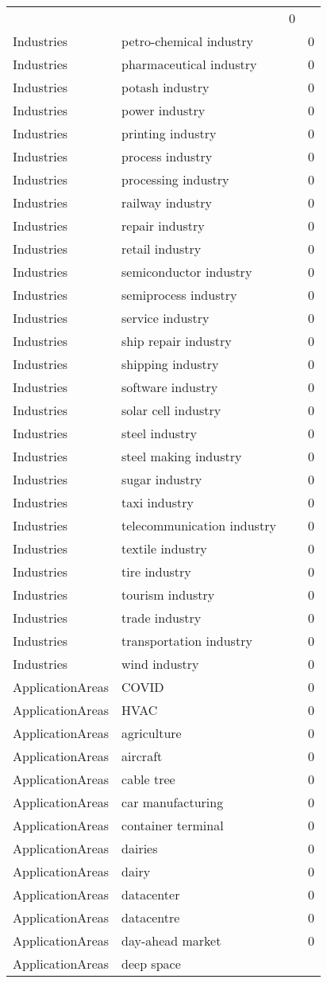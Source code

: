{\begin{longtable}{lp{10cm}rr}
&  & 0\\Industries & petro-chemical industry &  & 0\\Industries & pharmaceutical industry &  & 0\\Industries & potash industry &  & 0\\Industries & power industry &  & 0\\Industries & printing industry &  & 0\\Industries & process industry &  & 0\\Industries & processing industry &  & 0\\Industries & railway industry &  & 0\\Industries & repair industry &  & 0\\Industries & retail industry &  & 0\\Industries & semiconductor industry &  & 0\\Industries & semiprocess industry &  & 0\\Industries & service industry &  & 0\\Industries & ship repair industry &  & 0\\Industries & shipping industry &  & 0\\Industries & software industry &  & 0\\Industries & solar cell industry &  & 0\\Industries & steel industry &  & 0\\Industries & steel making industry &  & 0\\Industries & sugar industry &  & 0\\Industries & taxi industry &  & 0\\Industries & telecommunication industry &  & 0\\Industries & textile industry &  & 0\\Industries & tire industry &  & 0\\Industries & tourism industry &  & 0\\Industries & trade industry &  & 0\\Industries & transportation industry &  & 0\\Industries & wind industry &  & 0\\ApplicationAreas & COVID &  & 0\\ApplicationAreas & HVAC &  & 0\\ApplicationAreas & agriculture &  & 0\\ApplicationAreas & aircraft &  & 0\\ApplicationAreas & cable tree &  & 0\\ApplicationAreas & car manufacturing &  & 0\\ApplicationAreas & container terminal &  & 0\\ApplicationAreas & dairies &  & 0\\ApplicationAreas & dairy &  & 0\\ApplicationAreas & datacenter &  & 0\\ApplicationAreas & datacentre &  & 0\\ApplicationAreas & day-ahead market &  & 0\\ApplicationAreas & deep space &  & 
\end{longtable}}
